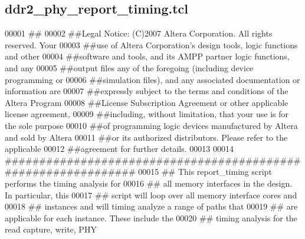 \subsection{ddr2\+\_\+phy\+\_\+report\+\_\+timing.\+tcl}
\label{ddr2__phy__report__timing_8tcl_source}

\begin{DoxyCode}
00001 \textcolor{comment}{##}
00002 \textcolor{comment}{}\textcolor{comment}{##Legal Notice: (C)2007 Altera Corporation. All rights reserved. Your}
00003 \textcolor{comment}{}\textcolor{comment}{##use of Altera Corporation's design tools, logic functions and other}
00004 \textcolor{comment}{}\textcolor{comment}{##software and tools, and its AMPP partner logic functions, and any}
00005 \textcolor{comment}{}\textcolor{comment}{##output files any of the foregoing (including device programming or}
00006 \textcolor{comment}{}\textcolor{comment}{##simulation files), and any associated documentation or information are}
00007 \textcolor{comment}{}\textcolor{comment}{##expressly subject to the terms and conditions of the Altera Program}
00008 \textcolor{comment}{}\textcolor{comment}{##License Subscription Agreement or other applicable license agreement,}
00009 \textcolor{comment}{}\textcolor{comment}{##including, without limitation, that your use is for the sole purpose}
00010 \textcolor{comment}{}\textcolor{comment}{##of programming logic devices manufactured by Altera and sold by Altera}
00011 \textcolor{comment}{}\textcolor{comment}{##or its authorized distributors. Please refer to the applicable}
00012 \textcolor{comment}{}\textcolor{comment}{##agreement for further details.}
00013 \textcolor{comment}{}
00014 \textcolor{comment}{##############################################################}
00015 \textcolor{comment}{}\textcolor{comment}{## This report\_timing script performs the timing analysis for}
00016 \textcolor{comment}{}\textcolor{comment}{## all memory interfaces in the design.  In particular, this}
00017 \textcolor{comment}{}\textcolor{comment}{## script will loop over all memory interface cores and}
00018 \textcolor{comment}{}\textcolor{comment}{## instances and will timing analyze a range of paths that}
00019 \textcolor{comment}{}\textcolor{comment}{## are applicable for each instance.  These include the}
00020 \textcolor{comment}{}\textcolor{comment}{## timing analysis for the read capture, write, PHY}

\end{DoxyCode}
